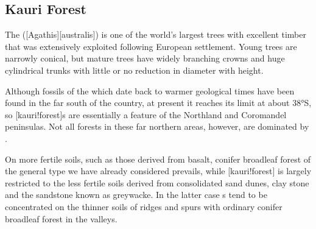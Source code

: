 \subsection{Kauri Forest}

The  ([Agathis][australis]) is one of the world's largest trees with excellent timber that was extensively exploited following European settlement.
Young trees are narrowly conical, but mature trees have widely branching crowns and huge cylindrical trunks with little or no reduction in diameter with height.

Although fossils of the  which date back to warmer geological times have been found in the far south of the country, at present it reaches its limit at about \ang{38}S, so [kauri!forest]s are essentially a feature of the Northland and Coromandel peninsulas.
Not all forests in these far northern areas, however, are dominated by .

On more fertile soils, such as those derived from basalt, conifer broadleaf forest of the general type we have already considered prevails, while [kauri!forest] is largely restricted to the less fertile soils derived from consolidated sand dunes, clay stone and the sandstone known as greywacke.
In the latter case s tend to be concentrated on the thinner soils of ridges and spurs with ordinary conifer broadleaf forest in the valleys.

